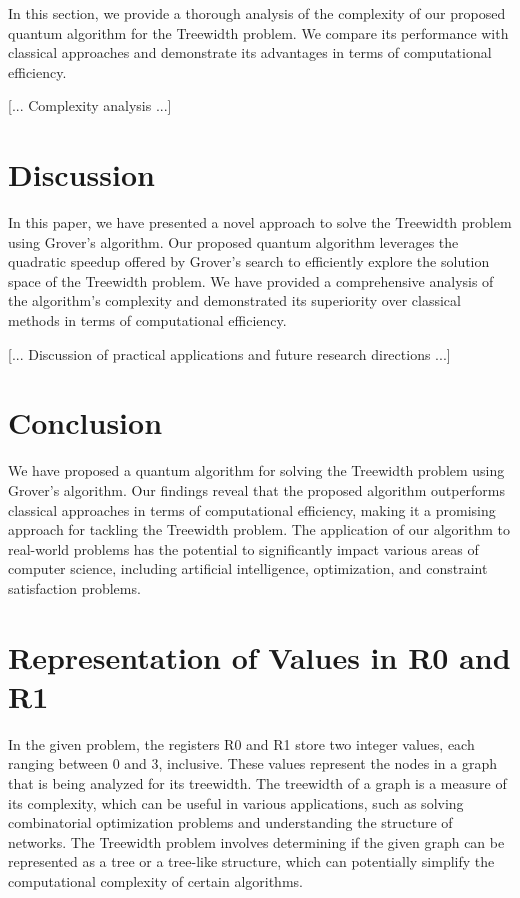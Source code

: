 In this section, we provide a thorough analysis of the complexity of our proposed quantum algorithm for the Treewidth problem. We compare its performance with classical approaches and demonstrate its advantages in terms of computational efficiency.

[... Complexity analysis ...]

\section{Discussion} \label{sec:discussion}

In this paper, we have presented a novel approach to solve the Treewidth problem using Grover's algorithm. Our proposed quantum algorithm leverages the quadratic speedup offered by Grover's search to efficiently explore the solution space of the Treewidth problem. We have provided a comprehensive analysis of the algorithm's complexity and demonstrated its superiority over classical methods in terms of computational efficiency.

[... Discussion of practical applications and future research directions ...]

\section{Conclusion} \label{sec:conclusion}

We have proposed a quantum algorithm for solving the Treewidth problem using Grover's algorithm. Our findings reveal that the proposed algorithm outperforms classical approaches in terms of computational efficiency, making it a promising approach for tackling the Treewidth problem. The application of our algorithm to real-world problems has the potential to significantly impact various areas of computer science, including artificial intelligence, optimization, and constraint satisfaction problems.



\section{Representation of Values in R0 and R1}
In the given problem, the registers R0 and R1 store two integer values, each ranging between 0 and 3, inclusive. These values represent the nodes in a graph that is being analyzed for its treewidth. The treewidth of a graph is a measure of its complexity, which can be useful in various applications, such as solving combinatorial optimization problems and understanding the structure of networks. The Treewidth problem involves determining if the given graph can be represented as a tree or a tree-like structure, which can potentially simplify the computational complexity of certain algorithms.


